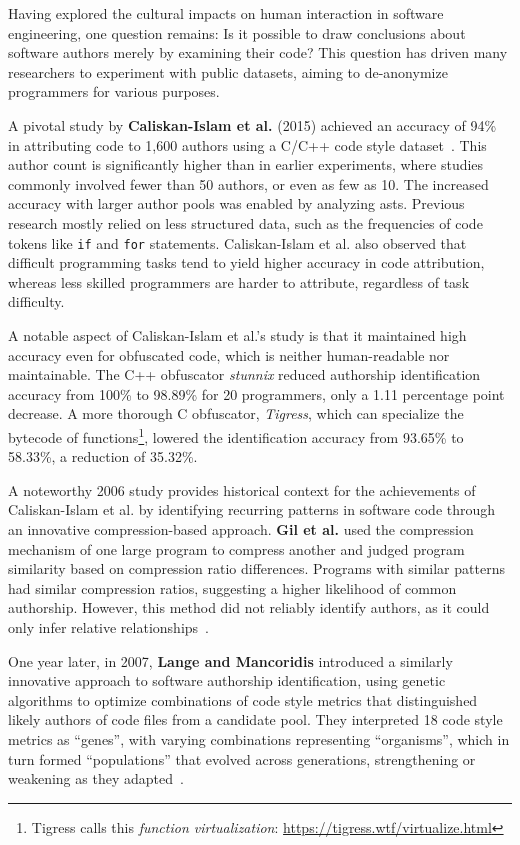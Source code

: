 Having explored the cultural impacts on human interaction in software engineering, one question remains: Is it possible to draw conclusions about software authors merely by examining their code?
This question has driven many researchers to experiment with public datasets, aiming to de-anonymize programmers for various purposes.

A pivotal study by \textbf{Caliskan-Islam et al.} (2015) achieved an accuracy of 94\% in attributing code to 1,600 authors using a C/C++ code style dataset~\cite{CaliskanIslam2015}.
This author count is significantly higher than in earlier experiments, where studies commonly involved fewer than 50 authors, or even as few as 10.
The increased accuracy with larger author pools was enabled by analyzing \acp{ast}.
Previous research mostly relied on less structured data, such as the frequencies of code tokens like \texttt{if} and \texttt{for} statements.
Caliskan-Islam et al. also observed that difficult programming tasks tend to yield higher accuracy in code attribution, whereas less skilled programmers are harder to attribute, regardless of task difficulty.

A notable aspect of Caliskan-Islam et al.'s study is that it maintained high accuracy even for obfuscated code, which is neither human-readable nor maintainable.
The C++ obfuscator \textit{stunnix} reduced authorship identification accuracy from 100\% to 98.89\% for 20 programmers, only a 1.11 percentage point decrease.
A more thorough C obfuscator, \textit{Tigress}, which can specialize the bytecode of functions\footnote{Tigress calls this \textit{function virtualization}: \url{https://tigress.wtf/virtualize.html}}, lowered the identification accuracy from 93.65\% to 58.33\%, a reduction of 35.32\%.

A noteworthy 2006 study provides historical context for the achievements of Caliskan-Islam et al. by identifying recurring patterns in software code through an innovative compression-based approach.
\textbf{Gil et al.} used the compression mechanism of one large program to compress another and judged program similarity based on compression ratio differences.
Programs with similar patterns had similar compression ratios, suggesting a higher likelihood of common authorship.
However, this method did not reliably identify authors, as it could only infer relative relationships~\cite{Gil2006}.

One year later, in 2007, \textbf{Lange and Mancoridis} introduced a similarly innovative approach to software authorship identification, using genetic algorithms to optimize combinations of code style metrics that distinguished likely authors of code files from a candidate pool.
They interpreted 18 code style metrics as ``genes'', with varying combinations representing ``organisms'', which in turn formed ``populations'' that evolved across generations, strengthening or weakening as they adapted~\cite{Lange2007}.


